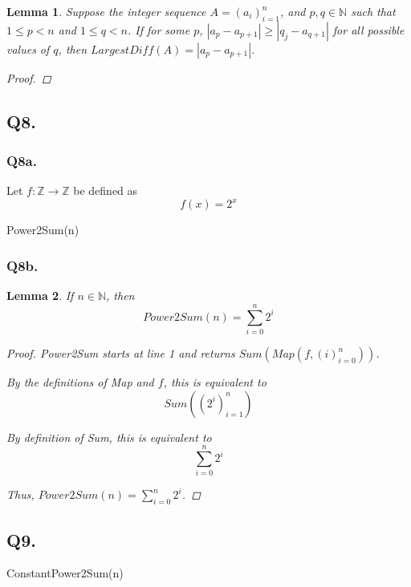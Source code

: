 \documentclass{article}
\newtheorem{lemma}{Lemma}
\theoremstyle{definition}
\begin{document}
\begin{lemma}
    Suppose the integer sequence $A = (a_i)^n_{i=1}$, and $p, q \in \mathbb{N}$ such that $1 \leq p < n$ and $1 \leq q < n$. If for some $p$, $|a_p - a_{p+1}| \geq |q_j - a_{q+1}|$ for all possible values of $q$, then $LargestDiff(A) = |a_p - a_{p+1}|$.
    \begin{proof}
        
    \end{proof}
\end{lemma}
\subsection{Q8.}
\subsubsection{Q8a.}
Let $f: \mathbb{Z} \rightarrow \mathbb{Z}$ be defined as 
$$f(x) = 2^x$$

\begin{algorithm}[H]


    \caption{Power2Sum(n)}
\end{algorithm} 

\subsubsection{Q8b.}
\begin{lemma}
    If $n \in \mathbb{N}$, then
    $$Power2Sum(n) = \sum^n_{i=0} 2^i$$
    \begin{proof}
        Power2Sum starts at line 1 and returns $Sum(Map(f, (i)^n_{i=0}))$.

        By the definitions of Map and $f$, this is equivalent to 
        $$Sum((2^i)^n_{i=1})$$

        By definition of Sum, this is equivalent to 
        $$\sum^n_{i=0} 2^i$$

        Thus, $Power2Sum(n) = \sum^n_{i=0} 2^i$.
    \end{proof}
\end{lemma}

\subsection{Q9.}

\begin{algorithm}


    \caption{ConstantPower2Sum(n)}
\end{algorithm}
\end{document}
